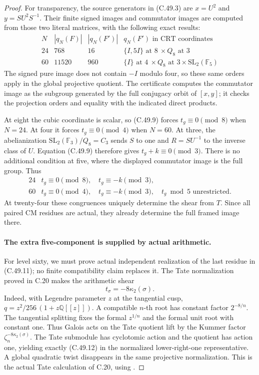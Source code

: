 \begin{proof}
For transparency, the source generators in (C.49.3) are
$x=U^2$ and $y=SU^2S^{-1}$. Their finite signed images and
commutator images are computed from those two literal matrices,
with the following exact results:
\[
\begin{array}{c|r|r|c}
N&|q_N(F)|&|q_N(F')|&q_N(F')\text{ in CRT coordinates}\\\hline
24&768&16&\{I,5I\}\text{ at }8\ \times Q_8\text{ at }3\\
60&11520&960&\{I\}\text{ at }4\ \times Q_8\text{ at }3
                         \times\mathrm{SL}_2(\mathbb F_5)
\end{array}                                                    \tag{C.49.10}
\]
The signed pure image does not contain $-I$ modulo four, so these
same orders apply in the global projective quotient.
The certificate computes the commutator image as the subgroup
generated by the full conjugacy orbit of $[x,y]$; it checks the
projection orders and equality with the indicated direct products.

At eight the cubic coordinate is scalar, so (C.49.9) forces
$t_g\equiv0\pmod8$ when $N=24$. At four it forces
$t_g\equiv0\pmod4$ when $N=60$.
At three, the abelianization
$\mathrm{SL}_2(\mathbb F_3)/Q_8=C_3$ sends $S$ to one and
$R=SU^{-1}$ to the inverse class of $U$.
Equation (C.49.9) therefore gives $t_g+k\equiv0\pmod3$.
There is no additional condition at five, where the displayed
commutator image is the full group. Thus
\[
\begin{array}{c|l}
24&t_g\equiv0\pmod8,\quad t_g\equiv-k\pmod3,\\
60&t_g\equiv0\pmod4,\quad t_g\equiv-k\pmod3,
                         \quad t_g\bmod5\text{ unrestricted}.
\end{array}                                                    \tag{C.49.11}
\]
At twenty-four these congruences uniquely determine the shear from
$T$. Since all paired CM residues are actual, they already determine
the full framed image there.

\paragraph{The extra five-component is supplied by actual arithmetic.}
For level sixty, we must prove actual independent realization of the
last residue in (C.49.11); no finite compatibility claim replaces it.
The Tate normalization proved in C.20 makes the arithmetic shear
\[
                            t_\sigma=-8\kappa_2(\sigma).
                                                               \tag{C.49.12}
\]
Indeed, with Legendre parameter $z$ at the tangential cusp,
$q=z^2/256\,(1+z\mathbb Q[[z]])$. A compatible $n$-th root has
constant factor $2^{-8/n}$. The tangential splitting fixes the
formal $z^{1/n}$ and the formal unit root with constant one.
Thus Galois acts on the Tate quotient lift by the Kummer factor
$\zeta_n^{-8\kappa_2(\sigma)}$. The Tate submodule has cyclotomic
action and the quotient has action one, yielding exactly (C.49.12)
in the normalized lower-right-one representative. A global quadratic
twist disappears in the same projective normalization.
This is the actual Tate calculation of C.20, using
\cite[III, \S3, equations (23)--(26)]{PBC_MilneEC2021}.


\end{proof}
